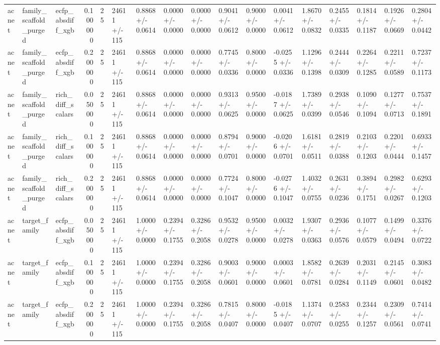 \begin{longtable}{lllrlllllllllllll}
acnet & family\_scaffold\_purged & ecfp\_absdiff\_xgb & 0.100000 & 25 & 24611 +/- 115 & 0.8868 +/- 0.0614 & 0.0000 +/- 0.0000 & 0.0000 +/- 0.0000 & 0.9041 +/- 0.0612 & 0.9000 +/- 0.0000 & 0.0041 +/- 0.0612 & 1.8670 +/- 0.0832 & 0.2455 +/- 0.0335 & 0.1814 +/- 0.1187 & 0.1926 +/- 0.0669 & 0.2804 +/- 0.0442 \\
acnet & family\_scaffold\_purged & ecfp\_absdiff\_xgb & 0.200000 & 25 & 24611 +/- 115 & 0.8868 +/- 0.0614 & 0.0000 +/- 0.0000 & 0.0000 +/- 0.0000 & 0.7745 +/- 0.0336 & 0.8000 +/- 0.0000 & -0.0255 +/- 0.0336 & 1.1296 +/- 0.1398 & 0.2444 +/- 0.0309 & 0.2264 +/- 0.1285 & 0.2211 +/- 0.0589 & 0.7237 +/- 0.1173 \\
acnet & family\_scaffold\_purged & rich\_diff\_scalars & 0.050000 & 25 & 24611 +/- 115 & 0.8868 +/- 0.0614 & 0.0000 +/- 0.0000 & 0.0000 +/- 0.0000 & 0.9313 +/- 0.0625 & 0.9500 +/- 0.0000 & -0.0187 +/- 0.0625 & 1.7389 +/- 0.0399 & 0.2938 +/- 0.0546 & 0.1090 +/- 0.1094 & 0.1277 +/- 0.0713 & 0.7537 +/- 0.1891 \\
acnet & family\_scaffold\_purged & rich\_diff\_scalars & 0.100000 & 25 & 24611 +/- 115 & 0.8868 +/- 0.0614 & 0.0000 +/- 0.0000 & 0.0000 +/- 0.0000 & 0.8794 +/- 0.0701 & 0.9000 +/- 0.0000 & -0.0206 +/- 0.0701 & 1.6181 +/- 0.0511 & 0.2819 +/- 0.0388 & 0.2103 +/- 0.1203 & 0.2201 +/- 0.0444 & 0.6933 +/- 0.1457 \\
acnet & family\_scaffold\_purged & rich\_diff\_scalars & 0.200000 & 25 & 24611 +/- 115 & 0.8868 +/- 0.0614 & 0.0000 +/- 0.0000 & 0.0000 +/- 0.0000 & 0.7724 +/- 0.1047 & 0.8000 +/- 0.0000 & -0.0276 +/- 0.1047 & 1.4032 +/- 0.0755 & 0.2631 +/- 0.0236 & 0.3894 +/- 0.1751 & 0.2982 +/- 0.0267 & 0.6293 +/- 0.1203 \\
acnet & target\_family & ecfp\_absdiff\_xgb & 0.050000 & 25 & 24611 +/- 115 & 1.0000 +/- 0.0000 & 0.2394 +/- 0.1755 & 0.3286 +/- 0.2058 & 0.9532 +/- 0.0278 & 0.9500 +/- 0.0000 & 0.0032 +/- 0.0278 & 1.9307 +/- 0.0363 & 0.2936 +/- 0.0576 & 0.1077 +/- 0.0579 & 0.1499 +/- 0.0494 & 0.3376 +/- 0.0722 \\
acnet & target\_family & ecfp\_absdiff\_xgb & 0.100000 & 25 & 24611 +/- 115 & 1.0000 +/- 0.0000 & 0.2394 +/- 0.1755 & 0.3286 +/- 0.2058 & 0.9003 +/- 0.0601 & 0.9000 +/- 0.0000 & 0.0003 +/- 0.0601 & 1.8582 +/- 0.0781 & 0.2639 +/- 0.0284 & 0.2031 +/- 0.1149 & 0.2145 +/- 0.0601 & 0.3083 +/- 0.0482 \\
acnet & target\_family & ecfp\_absdiff\_xgb & 0.200000 & 25 & 24611 +/- 115 & 1.0000 +/- 0.0000 & 0.2394 +/- 0.1755 & 0.3286 +/- 0.2058 & 0.7815 +/- 0.0407 & 0.8000 +/- 0.0000 & -0.0185 +/- 0.0407 & 1.1374 +/- 0.0707 & 0.2583 +/- 0.0255 & 0.2344 +/- 0.1257 & 0.2309 +/- 0.0561 & 0.7414 +/- 0.0741 \\

\end{longtable}

